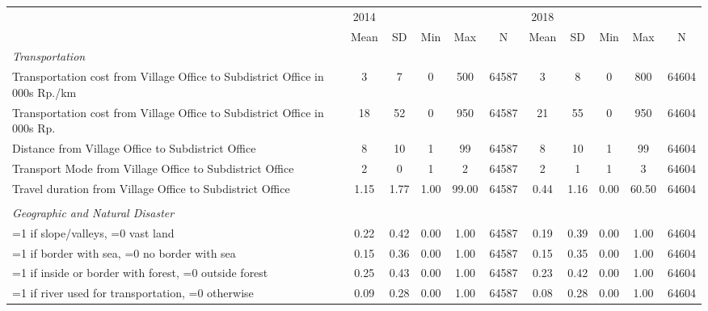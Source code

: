 \begin{tabular}{l*{2}{ccccc}}
\toprule
                &     2014&         &         &         &         &     2018&         &         &         &         \\
                &     Mean&       SD&      Min&      Max&        N&     Mean&       SD&      Min&      Max&        N\\
\midrule
\emph{Transportation}&         &         &         &         &         &         &         &         &         &         \\
Transportation cost from Village Office to Subdistrict Office in 000s Rp./km&        3&        7&        0&      500&    64587&        3&        8&        0&      800&    64604\\
Transportation cost from Village Office to Subdistrict Office in 000s Rp.&       18&       52&        0&      950&    64587&       21&       55&        0&      950&    64604\\
Distance from Village Office to Subdistrict Office&        8&       10&        1&       99&    64587&        8&       10&        1&       99&    64604\\
Transport Mode from Village Office to Subdistrict Office&        2&        0&        1&        2&    64587&        2&        1&        1&        3&    64604\\
Travel duration from Village Office to Subdistrict Office&     1.15&     1.77&     1.00&    99.00&    64587&     0.44&     1.16&     0.00&    60.50&    64604\\
\vspace{0.1em} \\ \emph{Geographic and Natural Disaster}&         &         &         &         &         &         &         &         &         &         \\
=1 if slope/valleys, =0 vast land&     0.22&     0.42&     0.00&     1.00&    64587&     0.19&     0.39&     0.00&     1.00&    64604\\
=1 if border with sea, =0 no border with sea&     0.15&     0.36&     0.00&     1.00&    64587&     0.15&     0.35&     0.00&     1.00&    64604\\
=1 if inside or border with forest, =0 outside forest&     0.25&     0.43&     0.00&     1.00&    64587&     0.23&     0.42&     0.00&     1.00&    64604\\
=1 if river used for transportation, =0 otherwise&     0.09&     0.28&     0.00&     1.00&    64587&     0.08&     0.28&     0.00&     1.00&    64604\\

\end{tabular}
